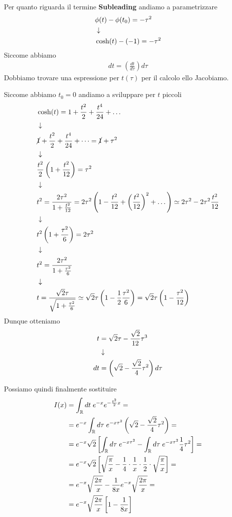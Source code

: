Per quanto riguarda il termine \textbf{Subleading} andiamo a parametrizzare
\begin{align}
	&\phi(t) - \phi(t_0) = -\tau^2 \\ &\downarrow \nonumber \\
	& \cosh(t) -(-1) = -\tau^2
\end{align}
Siccome abbiamo
\begin{align}
	dt = \left( \frac{dt}{d\tau} \right) d\tau
\end{align}
Dobbiamo trovare una espressione per $t(\tau)$ per il calcolo ello Jacobiamo.

Siccome abbiamo $t_0 = 0$ andiamo a sviluppare per $t$ piccoli
\begin{align}
	&\cosh(t) = 1 + \frac{t^2}{2} + \frac{t^4}{24} + \dots \\ &\downarrow \nonumber \\
	&\cancel{1} + \frac{t^2}{2} + \frac{t^4}{24} + \dots = \cancel{1} + \tau^2 \nonumber \\ &\downarrow \nonumber \\
	&\frac{t^2}{2} \left( 1 + \frac{t^2}{12} \right) = \tau^2 \\ &\downarrow \nonumber \\
	&t^2 = \frac{2\tau^2}{1 + \frac{t^2}{12}} = 2\tau^2 \left( 1 - \frac{t^2}{12} + \left( \frac{t^2}{12} \right)^2 + \dots \right) \simeq 2\tau^2 - 2\tau^2 \frac{t^2}{12} \\ &\downarrow \nonumber \\
	&t^2 \left( 1 + \frac{\tau^2}{6} \right) = 2\tau^2 \nonumber \\ &\downarrow \nonumber \\
	&t^2=\frac{2\tau^2}{1 + \frac{\tau^2}{6}}\nonumber \\ &\downarrow \nonumber \\
	&t=\frac{\sqrt{2}\tau}{\sqrt{1 + \frac{\tau^2}{6}}} \simeq \sqrt{2}\tau \left( 1 - \frac{1}{2} \frac{\tau^2}{6} \right) = \sqrt{2}\tau \left( 1 - \frac{\tau^2}{12} \right)
\end{align}
Dunque otteniamo
\begin{align}
	t &= \sqrt{2} \tau - \frac{\sqrt{2}}{12}\tau^3 \\ &\downarrow \nonumber \\
	dt &= \left( \sqrt{2} - \frac{\sqrt{2}}{4}\tau^2 \right)d\tau 
\end{align}

Possiamo quindi finalmente sostituire
\begin{align}
	I(x) &= \int_{\mathbb{R}} dt \; e^{-x} e^{-\frac{t^2}{2} x} = \nonumber \\
	&= e^{-x} \int_{\mathbb{R}} d\tau \; e^{-x\tau^2}  \left( \sqrt{2} - \frac{\sqrt{2}}{4}\tau^2 \right) = \nonumber \\
	&= e^{-x}\sqrt{2} \left[ \int_{\mathbb{R}} d\tau \; e^{-x\tau^2}   -\int_{\mathbb{R}} d\tau \;e^{-x\tau^2}  \frac{1}{4}\tau^2  \right]= \nonumber \\
	&= e^{-x}\sqrt{2} \left[ \sqrt{\frac{\pi}{x}}   - \frac{1}{4}\cdot\frac{1}{x} \cdot \frac{1}{2} \cdot \sqrt{\frac{\pi}{x}}  \right]= \nonumber \\
	&=e^{-x}\sqrt{\frac{2\pi}{x}} - \frac{1}{8x}e^{-x}\sqrt{\frac{2\pi}{x}}= \nonumber \\
	&=e^{-x}\sqrt{\frac{2\pi}{x}}\left[1 - \frac{1}{8x}\right]
\end{align}

